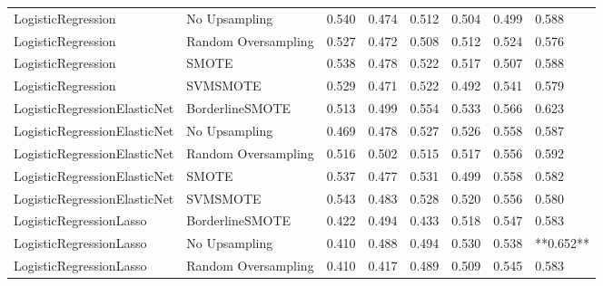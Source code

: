 \begin{tabular}{llllllll}
          LogisticRegression &       No Upsampling & 0.540 &                     0.474 &                 0.512 &                  0.504 &                                   0.499 &     0.588 \\
          LogisticRegression & Random Oversampling & 0.527 &                     0.472 &                 0.508 &                  0.512 &                                   0.524 &     0.576 \\
          LogisticRegression &               SMOTE & 0.538 &                     0.478 &                 0.522 &                  0.517 &                                   0.507 &     0.588 \\
          LogisticRegression &            SVMSMOTE & 0.529 &                     0.471 &                 0.522 &                  0.492 &                                   0.541 &     0.579 \\
LogisticRegressionElasticNet &     BorderlineSMOTE & 0.513 &                     0.499 &                 0.554 &                  0.533 &                                   0.566 &     0.623 \\
LogisticRegressionElasticNet &       No Upsampling & 0.469 &                     0.478 &                 0.527 &                  0.526 &                                   0.558 &     0.587 \\
LogisticRegressionElasticNet & Random Oversampling & 0.516 &                     0.502 &                 0.515 &                  0.517 &                                   0.556 &     0.592 \\
LogisticRegressionElasticNet &               SMOTE & 0.537 &                     0.477 &                 0.531 &                  0.499 &                                   0.558 &     0.582 \\
LogisticRegressionElasticNet &            SVMSMOTE & 0.543 &                     0.483 &                 0.528 &                  0.520 &                                   0.556 &     0.580 \\
     LogisticRegressionLasso &     BorderlineSMOTE & 0.422 &                     0.494 &                 0.433 &                  0.518 &                                   0.547 &     0.583 \\
     LogisticRegressionLasso &       No Upsampling & 0.410 &                     0.488 &                 0.494 &                  0.530 &                                   0.538 & **0.652** \\
     LogisticRegressionLasso & Random Oversampling & 0.410 &                     0.417 &                 0.489 &                  0.509 &                                   0.545 &     0.583 \\

\end{tabular}
